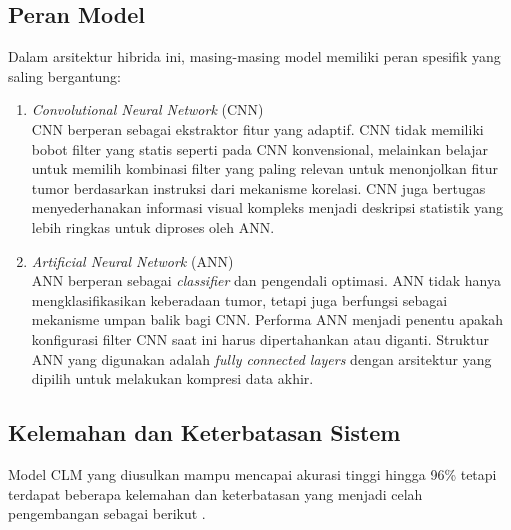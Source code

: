 \subsection{Peran Model}
Dalam arsitektur hibrida ini, masing-masing model memiliki peran spesifik yang saling bergantung:

\begin{enumerate}
	\item \textit{Convolutional Neural Network} (CNN)\\
	CNN berperan sebagai ekstraktor fitur yang adaptif. CNN tidak memiliki bobot filter yang statis seperti pada CNN konvensional, melainkan belajar untuk memilih kombinasi filter yang paling relevan untuk menonjolkan fitur tumor berdasarkan instruksi dari mekanisme korelasi. CNN juga bertugas menyederhanakan informasi visual kompleks menjadi deskripsi statistik yang lebih ringkas untuk diproses oleh ANN.
	\item \textit{Artificial Neural Network} (ANN)\\
	ANN berperan sebagai \textit{classifier} dan pengendali optimasi. ANN tidak hanya mengklasifikasikan keberadaan tumor, tetapi juga berfungsi sebagai mekanisme umpan balik bagi CNN. Performa ANN menjadi penentu apakah konfigurasi filter CNN saat ini harus dipertahankan atau diganti. Struktur ANN yang digunakan adalah \textit{fully connected layers} dengan arsitektur yang dipilih untuk melakukan kompresi data akhir.
\end{enumerate}

\subsection{Kelemahan dan Keterbatasan Sistem}
Model CLM yang diusulkan mampu mencapai akurasi tinggi hingga 96\% tetapi terdapat beberapa kelemahan dan keterbatasan yang menjadi celah pengembangan sebagai berikut \cite{wozniak2021deep}.

